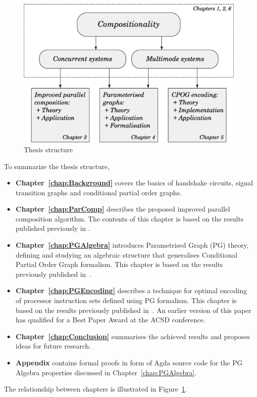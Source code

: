 \begin{figure}
\centering
   \includegraphics[scale=0.5]{fig/thesis}
   \caption{
     \label{fig:thesis_structure}
     Thesis structure}
\end{figure}

To summarize the thesis structure,

\begin{itemize}
\item
\textbf{Chapter~\ref{chap:Background}} covers the basics of handshake circuits, signal transition graphs and conditional partial order graphs.

\item
\textbf{Chapter~\ref{chap:ParComp}} describes the proposed improved parallel composition algorithm. The contents of this chapter is based on the results published previously in \cite{improved_par_comp}.

\item
\textbf{Chapter~\ref{chap:PGAlgebra}} introduces Parametrised Graph (PG) theory, defining and studying an algebraic structure that generalises Conditional Partial Order Graph formalism. This chapter is based on the results previously published in~\cite{pg_algebra}.

\item
\textbf{Chapter~\ref{chap:PGEncoding}} describes a technique for optimal encoding of processor instruction sets defined using PG formalism. This chapter is based on the results previously published in~\cite{cpog_encoding}. An earlier version of this paper has qualified for a Best Paper Award at the ACSD conference.

\item
\textbf{Chapter~\ref{chap:Conclusion}} summarises the achieved results and proposes ideas for future research.

\item
\textbf{Appendix} contains formal proofs in form of Agda source code for the PG Algebra properties discussed in Chapter~\ref{chap:PGAlgebra}.

\end{itemize}

The relationship between chapters is illustrated in Figure~\ref{fig:thesis_structure}.
